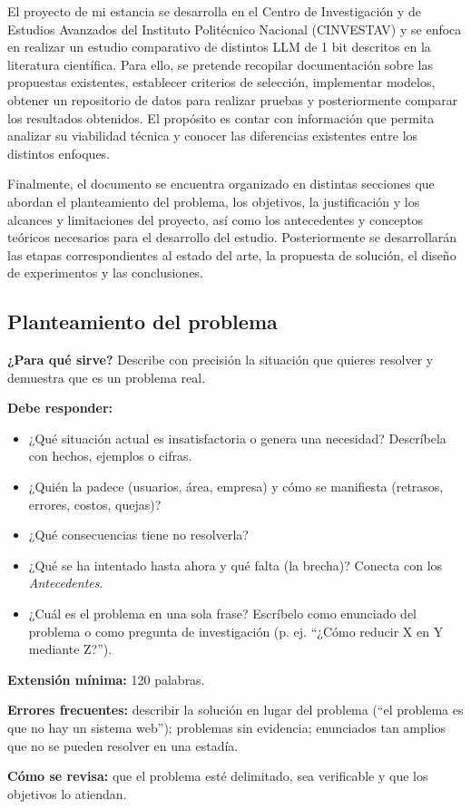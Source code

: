 El proyecto de mi estancia se desarrolla en el Centro de Investigación y de Estudios Avanzados del Instituto Politécnico Nacional (CINVESTAV) y se enfoca en realizar un estudio comparativo de distintos LLM de 1 bit descritos en la literatura científica. Para ello, se pretende recopilar documentación sobre las propuestas existentes, establecer criterios de selección, implementar modelos, obtener un repositorio de datos para realizar pruebas y posteriormente comparar los resultados obtenidos. El propósito es contar con información que permita analizar su viabilidad técnica y conocer las diferencias existentes entre los distintos enfoques.

Finalmente, el documento se encuentra organizado en distintas secciones que abordan el planteamiento del problema, los objetivos, la justificación y los alcances y limitaciones del proyecto, así como los antecedentes y conceptos teóricos necesarios para el desarrollo del estudio. Posteriormente se desarrollarán las etapas correspondientes al estado del arte, la propuesta de solución, el diseño de experimentos y las conclusiones.

\subsection{Planteamiento del problema} \label{sec:problema} %

\begin{guia}
\textbf{¿Para qué sirve?} Describe con precisión la situación que quieres resolver y demuestra que es un problema real.

\textbf{Debe responder:}
\begin{itemize}[nosep,leftmargin=*]
  \item ¿Qué situación actual es insatisfactoria o genera una necesidad? Descríbela con hechos, ejemplos o cifras.
  \item ¿Quién la padece (usuarios, área, empresa) y cómo se manifiesta (retrasos, errores, costos, quejas)?
  \item ¿Qué consecuencias tiene no resolverla?
  \item ¿Qué se ha intentado hasta ahora y qué falta (la brecha)? Conecta con los \emph{Antecedentes}.
  \item ¿Cuál es el problema en una sola frase? Escríbelo como enunciado del problema o como pregunta de
        investigación (p. ej. ``¿Cómo reducir X en Y mediante Z?'').
\end{itemize}

\textbf{Extensión mínima:} 120 palabras.

\textbf{Errores frecuentes:} describir la solución en lugar del problema (``el problema es que no hay un sistema web'');
problemas sin evidencia; enunciados tan amplios que no se pueden resolver en una estadía.

\textbf{Cómo se revisa:} que el problema esté delimitado, sea verificable y que los objetivos lo atiendan.
\end{guia}

